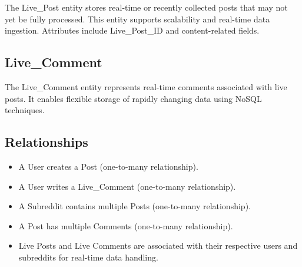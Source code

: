 The Live\_Post entity stores real-time or recently collected posts that may not yet be fully processed. This entity supports scalability and real-time data ingestion. Attributes include Live\_Post\_ID and content-related fields.

\subsection{Live\_Comment}

The Live\_Comment entity represents real-time comments associated with live posts. It enables flexible storage of rapidly changing data using NoSQL techniques.

\subsection{Relationships}

\begin{itemize}
    \item A User creates a Post (one-to-many relationship).
    \item A User writes a Live\_Comment (one-to-many relationship).
    \item A Subreddit contains multiple Posts (one-to-many relationship).
    \item A Post has multiple Comments (one-to-many relationship).
    \item Live Posts and Live Comments are associated with their respective users and subreddits for real-time data handling.
\end{itemize}
